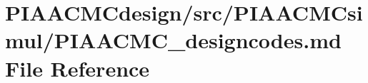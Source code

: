 \hypertarget{PIAACMCdesign_2src_2PIAACMCsimul_2PIAACMC__designcodes_8md}{\section{P\+I\+A\+A\+C\+M\+Cdesign/src/\+P\+I\+A\+A\+C\+M\+Csimul/\+P\+I\+A\+A\+C\+M\+C\+\_\+designcodes.md File Reference}
\label{PIAACMCdesign_2src_2PIAACMCsimul_2PIAACMC__designcodes_8md}
}
